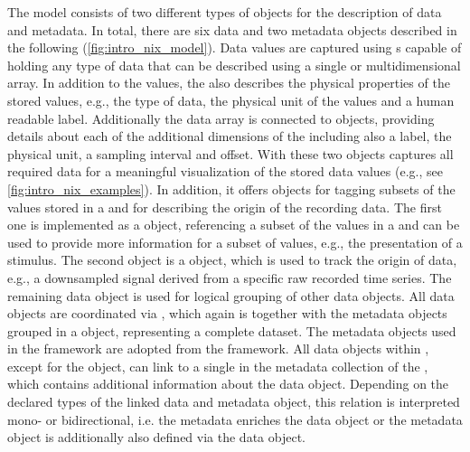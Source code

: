 The  model consists of two different types of objects for the description of data and metadata. In total, there are six data and two metadata objects  described in the following (\cref{fig:intro_nix_model}).
Data values are captured using s capable of holding any type of data that can be described using a single or multidimensional array. In addition to the values, the  also describes the physical properties of the stored values, e.g., the type of data, the physical unit of the values and a human readable label. Additionally the data array is connected to  objects, providing details about each of the additional dimensions of the  including also a label, the physical unit, a sampling interval and offset. With these two objects  captures all required data for a meaningful visualization of the stored data values (e.g., see \cref{fig:intro_nix_examples}). In addition, it offers objects for tagging subsets of the values stored in a  and for describing the origin of the recording data. The first one is implemented as a  object, referencing a subset of the values in a  and can be used to provide more information for a subset of values, e.g., the presentation of a stimulus. The second object is a  object, which is used to track the origin of data, e.g., a downsampled signal derived from a specific raw recorded time series. The remaining data object  is used for logical grouping of other  data objects. All data objects are coordinated via , which again is together with the metadata objects grouped in a   object, representing a complete dataset.
The metadata objects used in the  framework are adopted from the  framework. All data objects within , except for the  object, can link to a single  in the metadata collection of the  , which contains additional information about the data object. Depending on the declared types of the linked data and metadata object, this relation is interpreted mono- or bidirectional, i.e. the metadata  enriches the data object or the metadata object is additionally also defined via the data object.

